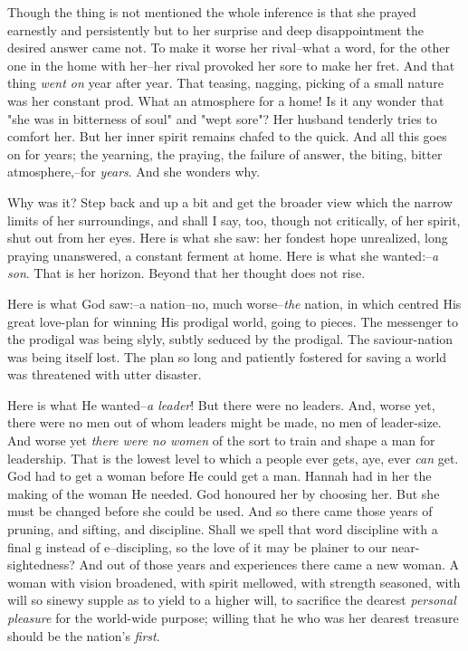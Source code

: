 Though the thing is not mentioned the whole inference is that she prayed
earnestly and persistently but to her surprise and deep disappointment the
desired answer came not. To make it worse her rival--what a word, for the
other one in the home with her--her rival provoked her sore to make her
fret. And that thing \textit{went on} year after year. That teasing, nagging,
picking of a small nature was her constant prod. What an atmosphere for a
home! Is it any wonder that "she was in bitterness of soul" and "wept
sore"? Her husband tenderly tries to comfort her. But her inner spirit
remains chafed to the quick. And all this goes on for years; the yearning,
the praying, the failure of answer, the biting, bitter atmosphere,--for
\textit{years}. And she wonders why.

Why was it? Step back and up a bit and get the broader view which the
narrow limits of her surroundings, and shall I say, too, though not
critically, of her spirit, shut out from her eyes. Here is what she saw:
her fondest hope unrealized, long praying unanswered, a constant ferment
at home. Here is what she wanted:--\textit{a son}. That is her horizon. Beyond
that her thought does not rise.

Here is what God saw:--a nation--no, much worse--\textit{the} nation, in which
centred His great love-plan for winning His prodigal world, going to
pieces. The messenger to the prodigal was being slyly, subtly seduced by
the prodigal. The saviour-nation was being itself lost. The plan so long
and patiently fostered for saving a world was threatened with utter
disaster.

Here is what He wanted--\textit{a leader}! But there were no leaders. And, worse
yet, there were no men out of whom leaders might be made, no men of
leader-size. And worse yet \textit{there were no women} of the sort to train and
shape a man for leadership. That is the lowest level to which a people
ever gets, aye, ever \textit{can} get. God had to get a woman before He could get
a man. Hannah had in her the making of the woman He needed. God honoured
her by choosing her. But she must be changed before she could be used. And
so there came those years of pruning, and sifting, and discipline. Shall
we spell that word discipline with a final g instead of e--discipling, so
the love of it may be plainer to our near-sightedness? And out of those
years and experiences there came a new woman. A woman with vision
broadened, with spirit mellowed, with strength seasoned, with will so
sinewy supple as to yield to a higher will, to sacrifice the dearest
\textit{personal pleasure} for the world-wide purpose; willing that he who was
her dearest treasure should be the nation's \textit{first}.

